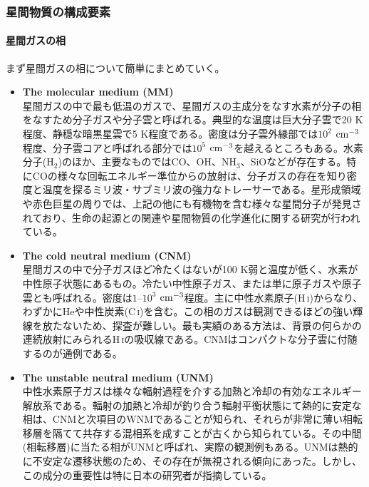 \subsubsection{星間物質の構成要素}
\label{c08.s1.ss1.sss1}

\paragraph{星間ガスの相}

まず星間ガスの相について簡単にまとめていく。
\begin{itemize}
\item {\bf The molecular medium (MM)}\\
星間ガスの中で最も低温のガスで、星間ガスの主成分をなす水素が分子の相をなすため分子ガスや分子雲と呼ばれる。典型的な温度は巨大分子雲で20 K程度、静穏な暗黒星雲で5 K程度である。密度は分子雲外縁部では$10^2$ ${\rm cm^{-3}}$程度、分子雲コアと呼ばれる部分では$10^5$ ${\rm cm^{-3}}$を越えるところもある。水素分子(H$_{2}$)のほか、主要なものではCO、OH、NH$_{3}$、SiOなどが存在する。特にCOの様々な回転エネルギー準位からの放射は、分子ガスの存在を知り密度と温度を探るミリ波・サブミリ波の強力なトレーサーである。星形成領域や赤色巨星の周りでは、上記の他にも有機物を含む様々な星間分子が発見されており、生命の起源との関連や星間物質の化学進化に関する研究が行われている\citep{2004PASJ...56...69K,2014ApJ...791L..38S}。

\item {\bf The cold neutral medium (CNM)}\\
星間ガスの中で分子ガスほど冷たくはないが100 K弱と温度が低く、水素が中性原子状態にあるもの。冷たい中性原子ガス、または単に原子ガスや原子雲とも呼ばれる。密度は$1$--$10^3$ ${\rm cm^{-3}}$程度。主に中性水素原子(H\,\textsc{i})からなり、わずかにHeや中性炭素(C\,\textsc{i})を含む。この相のガスは観測できるほどの強い輝線を放たないため、探査が難しい。最も実績のある方法は、背景の何らかの連続放射にみられるH\,\textsc{i}の吸収線である。CNMはコンパクトな分子雲に付随するのが通例である。

\item {\bf The unstable neutral medium (UNM)}\\
中性水素原子ガスは様々な輻射過程を介する加熱と冷却の有効なエネルギー解放系である。輻射の加熱と冷却が釣り合う輻射平衡状態にて熱的に安定な相は、CNMと次項目のWNMであることが知られ、それらが非常に薄い相転移層を隔てて共存する混相系を成すことが古くから知られている\citep{1969ApJ...155L.149F,1969JETP...29..170Z}。その中間(相転移層)に当たる相がUNMと呼ばれ、実際の観測例もある\citep{2010ApJ...725.1779B}。UNMは熱的に不安定な遷移状態のため、その存在が無視される傾向にあった。しかし、この成分の重要性は特に日本の研究者が指摘している。


\end{itemize}
